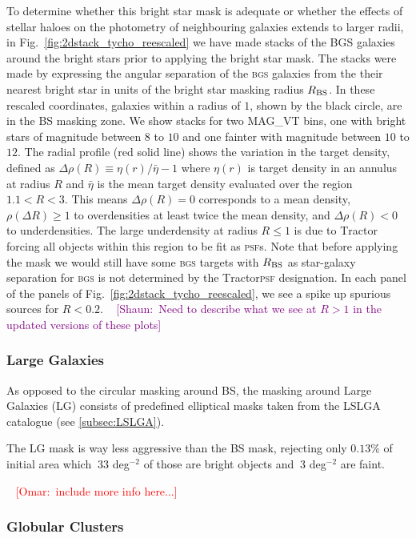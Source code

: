 \documentclass[fleqn,usenatbib]{mnras}
\newcommand{\shaun}[1]{~\newline\noindent \textcolor{Purple}{{ [Shaun:~{#1}]\\}}}
\newcommand{\omar}[1]{~\newline\noindent \textcolor{red}{{ [Omar:~{#1}]\\}}}
\newcommand{\BGS}{\textsc{bgs}\xspace}
\newcommand{\PSF}{\textsc{psf}\xspace}
\newcommand{\PSFs}{\textsc{psf}s\xspace}
\newcommand{\TRACTOR}{\textsc{T}ractor\xspace}
\begin{document}
To determine whether this bright star mask is adequate or whether the effects of stellar haloes on the photometry of neighbouring galaxies extends to larger radii,  in Fig.~\ref{fig:2dstack_tycho_reescaled}  we have made stacks of the BGS galaxies around the bright stars prior to applying the bright star mask.
The stacks were made by expressing the angular separation of the \BGS galaxies from the their nearest bright star in units of the
bright star masking radius $R_{\rm BS}$.
In these rescaled coordinates, galaxies within a radius of $1$, shown by the black circle, are in the BS masking zone.
We show stacks for two MAG\_VT bins, one with bright stars of magnitude between $8$ to $10$ and one fainter with magnitude between $10$ to $12$. The radial profile (red solid line) shows the variation in the target density, defined as $\Delta\rho(R) \equiv {\eta}(r)/\bar\eta - 1$ where ${\eta}(r)$ is target density in an annulus at radius $R$ and $\bar\eta$ is the mean target density
evaluated over the region $1.1 < R < 3$. This means $\Delta\rho(R) = 0$ corresponds to a mean density, $\rho(\Delta R) \ge 1$ to overdensities at least twice the mean density, and $\Delta\rho(R) < 0$ to underdensities. The large underdensity at radius $R \le 1$ is due to \TRACTOR forcing all objects within this region to be fit as \PSFs. Note that before applying the mask we would still have some \BGS targets with $R_{\rm BS}$ as star-galaxy separation for \BGS is not determined by the \TRACTOR \PSF designation.
In each panel of the panels of 
Fig.~\ref{fig:2dstack_tycho_reescaled}, we see a spike up spurious sources for $R < 0.2$.
\shaun{Need to describe what we see at $R>1$ in the updated versions of these plots}


\subsubsection{Large Galaxies}

As opposed to the circular masking around BS, the masking around Large Galaxies (LG) consists of predefined elliptical masks taken from the LSLGA catalogue (see \ref{subsec:LSLGA}).

The LG mask is way less aggressive than the BS mask, rejecting only $0.13 \%$ of initial area which $~33$ deg$^{-2}$ of those are bright objects and $~3$ deg$^{-2}$ are faint.

\omar{include more info here...}

\subsubsection{Globular Clusters}
\end{document}
